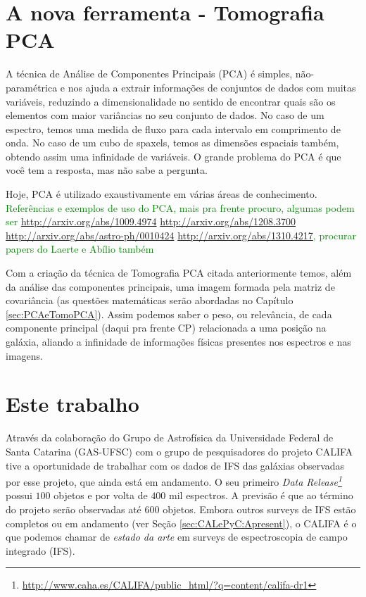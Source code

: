 \section{A nova ferramenta - Tomografia PCA}
\label{sec:Intro:TomoPCA}

A técnica de Análise de Componentes Principais (PCA) é simples, não-paramétrica
e nos ajuda a extrair informações de conjuntos de dados com muitas variáveis,
reduzindo a dimensionalidade no sentido de encontrar quais são os elementos com
maior variâncias no seu conjunto de dados. No caso de um espectro, temos uma
medida de fluxo para cada intervalo em comprimento de onda. No caso de um cubo
de spaxels, temos as dimensões espaciais também, obtendo assim uma infinidade de
variáveis. O grande problema do PCA é que você tem a resposta, mas não sabe a
pergunta.

Hoje, PCA é utilizado exaustivamente em várias áreas de conhecimento. \ojo
\citneed \textcolor{green}{Referências e exemplos de uso do PCA, mais pra
frente procuro, algumas podem ser 
\url{http://arxiv.org/abs/1009.4974}
\url{http://arxiv.org/abs/1208.3700}
\url{http://arxiv.org/abs/astro-ph/0010424}
\url{http://arxiv.org/abs/1310.4217}, procurar papers do Laerte e Abílio
também}

Com a criação da técnica de Tomografia PCA citada anteriormente temos, além da
análise das componentes principais, uma imagem formada pela matriz de
covariância (as questões matemáticas serão abordadas no
Capítulo \ref{sec:PCAeTomoPCA}). Assim podemos saber o peso, ou relevância, de
cada componente principal (daqui pra frente CP) relacionada a uma posição na
galáxia, aliando a infinidade de informações físicas presentes nos espectros e
nas imagens.

\section{Este trabalho}
\label{sec:Intro:ThisWork}

Através da colaboração do Grupo de Astrofísica da Universidade Federal de Santa
Catarina (GAS-UFSC) com o grupo de pesquisadores do projeto CALIFA tive a
oportunidade de trabalhar com os dados de IFS das galáxias observadas por esse
projeto, que ainda está em andamento. O seu primeiro {\em Data
Release\footnote{\url{http://www.caha.es/CALIFA/public_html/?q=content/califa-dr1}}}
\citep[][DR1]{Husemann2013} possui $100$ objetos e por volta de $400$ mil
espectros.
A previsão é que ao término do projeto serão observadas até $600$ objetos. Embora
outros surveys de IFS estão completos ou em andamento (ver Seção
\ref{sec:CALePyC:Apresent}), o CALIFA é o que podemos chamar de {\em estado da
arte} em surveys de espectroscopia de campo integrado (IFS).

